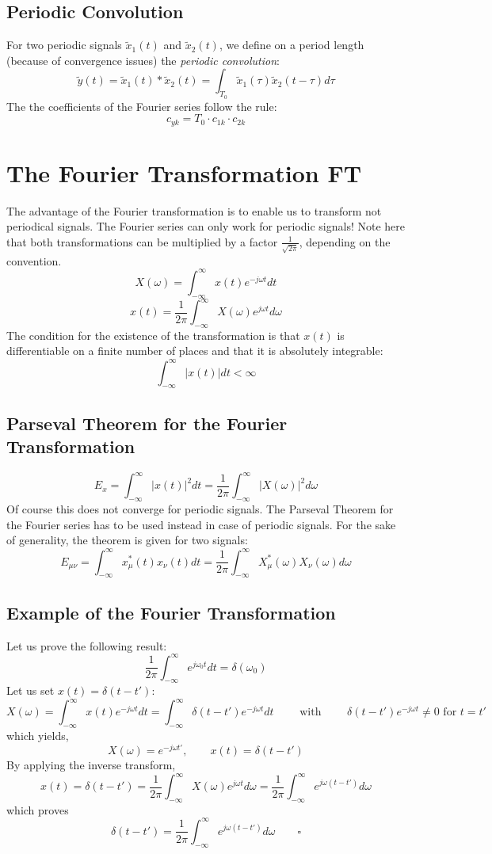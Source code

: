 \documentclass[10pt,a4paper]{article}
\begin{document}
\subsection{Periodic Convolution}
For two periodic signals $\tilde{x}_1(t)$ and $\tilde{x}_2(t)$, we define on a period length (because of convergence issues) the \textit{periodic convolution}:
$$
\tilde{y}(t) = \tilde{x}_1(t) * \tilde{x}_2(t) 
			 = \int_{T_0}{\tilde{x}_1(\tau) \tilde{x}_2(t-\tau)} d\tau
$$ 
The the coefficients of the Fourier series follow the rule: 
$$
\boxed{ c_{yk} = T_0 \cdot c_{1k} \cdot c_{2k} }
$$


\section{The Fourier Transformation FT}
The advantage of the Fourier transformation is to enable us to transform not periodical signals. The Fourier series can only work for periodic signals! Note here that both transformations can be multiplied by a factor $\frac{1}{\sqrt{2\pi}}$, depending on the convention. 
$$
\boxed{
X(\omega) = \int_{-\infty}^{\infty} x(t) e^{-j \omega t} dt
}
$$
$$
\boxed{
x(t) = \frac{1}{2\pi} \int_{-\infty}^{\infty} X(\omega) e^{j \omega t} d\omega
}
$$
The condition for the existence of the transformation is that $x(t)$ is differentiable on a finite number of places and that it is absolutely integrable:
$$
\int_{-\infty}^{\infty} \vert x(t) \vert dt < \infty
$$

\subsection{Parseval Theorem for the Fourier Transformation}
$$
\boxed{
E_x = \int_{-\infty}^{\infty} \vert x(t) \vert ^2 dt 
	= \frac{1}{2\pi} \int_{-\infty}^{\infty} \vert X(\omega) \vert^2 d\omega
}
$$
Of course this does not converge for periodic signals. The Parseval Theorem for the Fourier series has to be used instead in case of periodic signals. For the sake of generality, the theorem is given for two signals: 
$$
E_{\mu \nu} = \int_{-\infty}^{\infty} x_\mu^*(t)x_\nu(t) dt 
			= \frac{1}{2\pi}\int_{-\infty}^{\infty} X_\mu^*(\omega)X_\nu(\omega) d\omega
$$
\subsection{Example of the Fourier Transformation}
Let us prove the following result: 
$$
\boxed{
\frac{1}{2\pi} \int_{-\infty}^{\infty} e^{j\omega_0t} dt = \delta(\omega_0)
}
$$
Let us set $x(t) = \delta(t-t')$:
$$
X(\omega) = \int_{-\infty}^{\infty} x(t) e^{-j \omega t} dt
		  = \int_{-\infty}^{\infty} \delta(t-t') e^{-j \omega t} dt
\qquad \text{ with } \qquad \delta(t-t') e^{-j \omega t} \neq 0 \text{ for } t = t'
$$
which yields,
$$
X(\omega) = e^{-j \omega t'}, \qquad x(t) = \delta(t-t')
$$
By applying the inverse transform,
$$
x(t) = \delta(t-t') 
	 = \frac{1}{2\pi} \int_{-\infty}^{\infty} X(\omega) e^{j \omega t} d\omega
	 = \frac{1}{2\pi} \int_{-\infty}^{\infty} e^{j \omega (t-t')} d\omega
$$
which proves
$$
\delta(t-t') = \frac{1}{2\pi} \int_{-\infty}^{\infty} e^{j \omega (t-t')} d\omega
\qquad \square
$$
\end{document}
